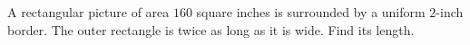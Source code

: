 A rectangular picture of area $160$ square inches is surrounded by a uniform $2$-inch border. The outer rectangle is twice as long as it is wide. Find its length.
